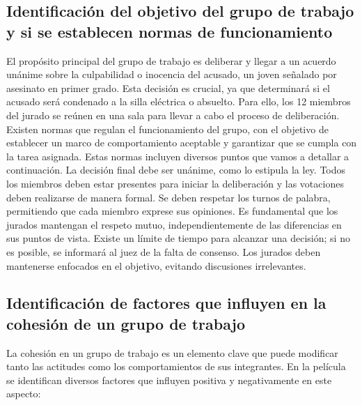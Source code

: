 \documentclass{article}
\begin{document}
\subsection{Identificación del objetivo del grupo de trabajo y si se establecen normas de funcionamiento}

El propósito principal del grupo de trabajo es deliberar y llegar a un acuerdo unánime sobre la culpabilidad o inocencia del acusado, un joven señalado por asesinato en primer grado. Esta decisión es crucial, ya que determinará si el acusado será condenado a la silla eléctrica o absuelto. Para ello, los 12 miembros del jurado se reúnen en una sala para llevar a cabo el proceso de deliberación.\\

Existen normas que regulan el funcionamiento del grupo, con el objetivo de establecer un marco de comportamiento aceptable y garantizar que se cumpla con la tarea asignada. Estas normas incluyen diversos puntos que vamos a detallar a continuación.
La decisión final debe ser unánime, como lo estipula la ley. Todos los miembros deben estar presentes para iniciar la deliberación y las votaciones deben realizarse de manera formal. Se deben respetar los turnos de palabra, permitiendo que cada miembro exprese sus opiniones. Es fundamental que los jurados mantengan el respeto mutuo, independientemente de las diferencias en sus puntos de vista. Existe un límite de tiempo para alcanzar una decisión; si no es posible, se informará al juez de la falta de consenso. Los jurados deben mantenerse enfocados en el objetivo, evitando discusiones irrelevantes.

\subsection{Identificación de factores que influyen en la cohesión de un grupo de trabajo}

La cohesión en un grupo de trabajo es un elemento clave que puede modificar tanto las actitudes como los comportamientos de sus integrantes. En la película se identifican diversos factores que influyen positiva y negativamente en este aspecto:
\end{document}
